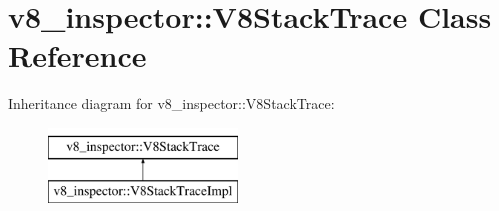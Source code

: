 \hypertarget{classv8__inspector_1_1V8StackTrace}{}\section{v8\+\_\+inspector\+:\+:V8\+Stack\+Trace Class Reference}
\label{classv8__inspector_1_1V8StackTrace}
Inheritance diagram for v8\+\_\+inspector\+:\+:V8\+Stack\+Trace\+:\begin{figure}[H]
\begin{center}
\leavevmode
\includegraphics[height=2.000000cm]{classv8__inspector_1_1V8StackTrace}
\end{center}
\end{figure}
